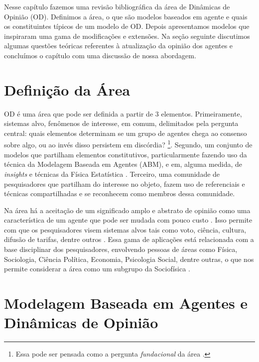 Nesse capítulo fazemos uma revisão bibliográfica da área de Dinâmicas de
Opinião (OD). Definimos a área, o
que são modelos baseados em agente e quais os constituintes típicos de um modelo
de OD. Depois apresentamos modelos que inspiraram uma gama de modificações e
extensões. Na seção seguinte discutimos algumas questões teóricas referentes à
atualização da opinião dos agentes e concluímos o capítulo com uma discussão de
nossa abordagem.


\section{Definição da Área}

OD é uma área que pode ser definida a partir de 3 elementos. Primeiramente,
sistemas alvo, fenômenos de interesse, em comum, delimitados pela pergunta
central: quais elementos determinam se um grupo de agentes chega ao consenso
sobre algo, ou ao invés disso persistem em discórdia?
\cite{castellano2012social}\footnote{Essa pode ser pensada como a pergunta
  \textit{fundacional} da área \cite{flache2017}.}. Segundo, um conjunto de
modelos que partilham elementos constitutivos, particularmente fazendo uso da
técnica da Modelagem Baseada em Agentes (ABM), e em, alguma medida, de
\textit{insights} e técnicas da Física Estatística \cite{galam1990social}.
Terceiro, uma comunidade de pesquisadores que partilham do interesse no objeto,
fazem uso de referenciais e técnicas compartilhadas e se reconhecem como membros
dessa comunidade.

Na área há a aceitação de um significado amplo e abstrato de opinião como uma
característica de um agente que pode ser mudada com pouco custo
\cite[p.312]{castellano2012social}. Isso permite com que os pesquisadores visem
sistemas alvos tais como voto, ciência, cultura, difusão de tarifas, dentre
outros
\cite{kowalska2013going,martins2015thou,axelrod1997dissemination,galam1990social}.
Essa gama de aplicações está relacionada com a base disciplinar dos
pesquisadores, envolvendo pessoas de áreas como Física, Sociologia, Ciência
Política, Economia, Psicologia Social, dentre outras, o que nos permite
considerar a área como um subgrupo da Sociofísica
\cite{galam1982sociophysics,galam2012sociophysics}.


\section{Modelagem Baseada em Agentes e Dinâmicas de Opinião}

